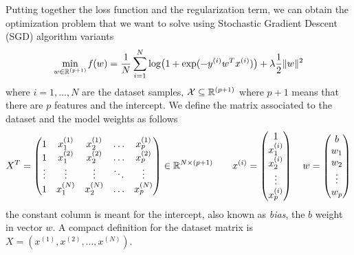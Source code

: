 Putting together the loss function and the regularization term, we can obtain the optimization problem that we want to solve using Stochastic Gradient Descent (SGD) algorithm variants
\begin{equation}\label{eq:opt-prob}
\min_{w\in\mathbb{R}^{(p+1)}}\operatorname*{\mathit{f}}(w)=\frac{1}{N}\sum_{i=1}^N\log\bigl(1+\exp(-y^{(i)}w^Tx^{(i)})\bigr)+\lambda\frac{1}{2}\lVert w\rVert^2
\end{equation}
where $i=1,\dots,N$ are the dataset samples, $\mathcal{X}\subseteq\mathbb{R}^{(p+1)}$ where $p+1$ means that there are $p$ features and the intercept. %
We define the matrix associated to the dataset and the model weights as follows
\[
X^T=
\begin{pmatrix}
1 & x_1^{(1)} & x_2^{(1)} & \dots & x_p^{(1)} \\
1 & x_1^{(2)} & x_2^{(2)} & \dots & x_p^{(2)} \\
\vdots & \vdots & \vdots & \ddots & \vdots \\
1 & x_1^{(N)} & x_2^{(N)} & \dots & x_p^{(N)}
\end{pmatrix}\in\mathbb{R}^{N\times(p+1)}\qquad
x^{(i)}=
\begin{pmatrix}
1 \\ x_1^{(i)} \\ x_2^{(i)} \\ \vdots \\ x_p^{(i)}
\end{pmatrix}\quad
w=
\begin{pmatrix}
b \\ w_1 \\ w_2 \\ \vdots \\ w_p
\end{pmatrix}
\]
the constant column is meant for the intercept, also known as \emph{bias}, the $b$ weight in vector $w$. A compact definition for the dataset matrix is $X=(x^{(1)},x^{(2)},\dots,x^{(N)})$.%

